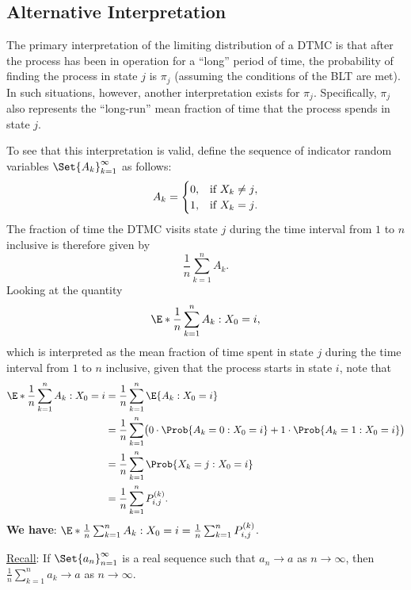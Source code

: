 \subsection*{Alternative Interpretation}
\begin{Regular}
    The primary interpretation of the limiting distribution of a DTMC is that after the process has
    been in operation for a ``long'' period of time, the probability of finding the process in state $j$
    is $ \pi_j $ (assuming the conditions of the BLT are met). In such situations, however, another
    interpretation exists for $ \pi_j $. Specifically, $ \pi_j $ also represents the ``long-run'' mean fraction of
    time that the process spends in state $j$.

    To see that this interpretation is valid, define the sequence of indicator random variables
    $ \Set{A_k}_{k=1}^\infty $ as follows:
    \[ A_k=\begin{cases}
            0, & \text{if $ X_k\ne j $}, \\
            1, & \text{if $ X_k=j $}.
        \end{cases} \]
    The fraction of time the DTMC visits state $j$ during the time interval from $1$ to $n$ inclusive is
    therefore given by
    \[ \frac{1}{n}\sum_{k=1}^{n} A_k. \]
    Looking at the quantity
    \[ \E*{\frac{1}{n} \sum_{k=1}^{n} A_k\given X_0=i}, \]
    which is interpreted as the mean fraction of time spent in state $j$ during the time interval from
    $1$ to $n$ inclusive, given that the process starts in state $i$, note that
    \begin{align*}
        \E*{\frac{1}{n} \sum_{k=1}^{n} A_{k} \given X_{0}=i}
         & =\frac{1}{n} \sum_{k=1}^{n} \E{A_{k} \given X_{0}=i}                                                               \\
         & =\frac{1}{n} \sum_{k=1}^{n}\bigl(0 \cdot \Prob{A_{k}=0 \given X_{0}=i}+1 \cdot \Prob{A_{k}=1 \given X_{0}=i}\bigr) \\
         & =\frac{1}{n} \sum_{k=1}^{n} \Prob{X_{k}=j \given X_{0}=i}                                                          \\
         & =\frac{1}{n} \sum_{k=1}^{n} P_{i, j}^{(k)} .
    \end{align*}
    \textbf{We have}: $ \E*{\frac{1}{n} \sum_{k=1}^{n} A_{k} \given X_{0}=i}=\frac{1}{n} \sum_{k=1}^{n} P_{i, j}^{(k)}  $.

    \underline{Recall}: If $ \Set{a_n}_{n=1}^\infty $ is a real sequence such that $ a_n\to a $ as $ n\to\infty $, then
    $ \frac{1}{n} \sum_{k=1}^{n} a_k\to a $ as $ n\to\infty $.


\end{Regular}
